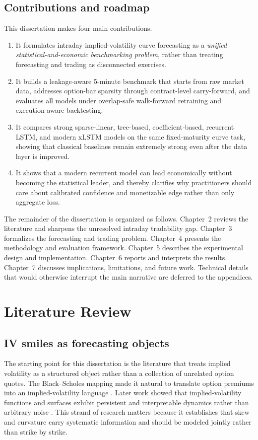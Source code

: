 \documentclass[12pt]{report}
\begin{document}
\section{Contributions and roadmap}
This dissertation makes four main contributions.
\begin{enumerate}[leftmargin=1.3cm]
    \item It formulates intraday implied-volatility curve forecasting as a \emph{unified statistical-and-economic benchmarking problem}, rather than treating forecasting and trading as disconnected exercises.
    \item It builds a leakage-aware 5-minute benchmark that starts from raw market data, addresses option-bar sparsity through contract-level carry-forward, and evaluates all models under overlap-safe walk-forward retraining and execution-aware backtesting.
    \item It compares strong sparse-linear, tree-based, coefficient-based, recurrent LSTM, and modern xLSTM models on the same fixed-maturity curve task, showing that classical baselines remain extremely strong even after the data layer is improved.
    \item It shows that a modern recurrent model can lead economically without becoming the statistical leader, and thereby clarifies why practitioners should care about calibrated confidence and monetizable edge rather than only aggregate loss.
\end{enumerate}

The remainder of the dissertation is organized as follows. Chapter~2 reviews the literature and sharpens the unresolved intraday tradability gap. Chapter~3 formalizes the forecasting and trading problem. Chapter~4 presents the methodology and evaluation framework. Chapter~5 describes the experimental design and implementation. Chapter~6 reports and interprets the results. Chapter~7 discusses implications, limitations, and future work. Technical details that would otherwise interrupt the main narrative are deferred to the appendices.

\chapter{Literature Review}

\section{IV smiles as forecasting objects}
The starting point for this dissertation is the literature that treats implied volatility as a structured object rather than a collection of unrelated option quotes. The Black--Scholes mapping made it natural to translate option premiums into an implied-volatility language \citep{black1973}. Later work showed that implied-volatility functions and surfaces exhibit persistent and interpretable dynamics rather than arbitrary noise \citep{dumas1998,cont2002dynamics}. This strand of research matters because it establishes that skew and curvature carry systematic information and should be modeled jointly rather than strike by strike.
\end{document}

